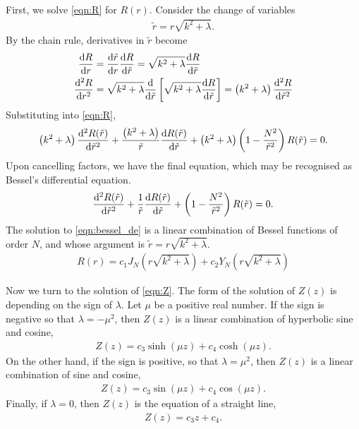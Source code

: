 First, we solve \eqref{eqn:R} for $R(r)$.
Consider the change of variables
\begin{align}
	\tilde{r} = r \sqrt{k^2 + \lambda}.
\end{align}
By the chain rule, derivatives in $\tilde{r}$ become
\begin{align}
	\frac{\mathrm{d} R}{\mathrm{d} r} &= \frac{\mathrm{d} \tilde{r}}{\mathrm{d} r} \frac{\mathrm{d} R}{\mathrm{d} \tilde{r}} = \sqrt{k^2 + \lambda} \frac{\mathrm{d} R}{\mathrm{d} \tilde{r}} \\
	\frac{\mathrm{d}^2 R}{\mathrm{d} r^2} &= \sqrt{k^2 + \lambda} \frac{\mathrm{d}}{\mathrm{d} \tilde{r}} \left[ \sqrt{k^2 + \lambda} \frac{\mathrm{d} R}{\mathrm{d} \tilde{r}} \right]
							= \left(k^2 + \lambda\right) \frac{\mathrm{d}^2 R}{\mathrm{d} \tilde{r}^2}
\end{align}
Substituting into \eqref{eqn:R}, 
\begin{align}
	\left(k^2 + \lambda\right) \frac{\mathrm{d}^2 R(\tilde{r})}{\mathrm{d} \tilde{r}^2} + 
	\frac{\left(k^2 + \lambda\right)}{\tilde{r}} \frac{\mathrm{d} R(\tilde{r})}{\mathrm{d} \tilde{r}} + 
	\left(k^2 + \lambda\right) \left( 1 - \frac{N^2}{\tilde{r}^2} \right) R(\tilde{r}) = 0.
\end{align}
Upon cancelling factors, we have the final equation, which may be recognised as Bessel's differential equation.
\begin{align}
	\frac{\mathrm{d}^2 R(\tilde{r})}{\mathrm{d} \tilde{r}^2} + 
	\frac{1}{\tilde{r}} \frac{\mathrm{d} R(\tilde{r})}{\mathrm{d} \tilde{r}} + 
	\left( 1 - \frac{N^2}{\tilde{r}^2} \right) R(\tilde{r}) = 0. \label{eqn:bessel_de}
\end{align}
The solution to \eqref{eqn:bessel_de} is a linear combination of Bessel functions of order $N$, and whose argument is $\tilde{r}=r \sqrt{k^2 + \lambda}$.
\begin{align}
	R(r) = c_1 J_N \left( r \sqrt{k^2 + \lambda} \right) + c_2 Y_N \left( r \sqrt{k^2 + \lambda} \right)
\end{align}


Now we turn to the solution of \eqref{eqn:Z}.
The form of the solution of $Z(z)$ is depending on the sign of $\lambda$.
Let $\mu$ be a positive real number.
If the sign is negative so that $\lambda=-\mu^2$, then $Z(z)$ is a linear combination of hyperbolic sine and cosine,
\begin{align}
	Z(z) = c_3 \sinh(\mu z) + c_4 \cosh(\mu z).
\end{align}
On the other hand, if the sign is positive, so that $\lambda=\mu^2$, then $Z(z)$ is a linear combination of sine and cosine,
\begin{align}
	Z(z) = c_3 \sin(\mu z) + c_4 \cos(\mu z).
\end{align}
Finally, if $\lambda=0$, then $Z(z)$ is the equation of a straight line,
\begin{align}
	Z(z) = c_3 z + c_4.
\end{align}

